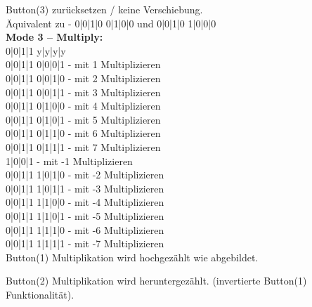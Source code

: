 \noindent Button(3) zurücksetzen / keine Verschiebung.\\
Äquivalent zu - {\color{red} 0}{\color{blue}|0|1|0} {\color{orange} 0|1|0|0} und 
{\color{red} 0}{\color{blue}|0|1|0} {\color{orange} 1|0|0|0}\\

\textbf{Mode 3 – Multiply:}\\
{\color{red} 0}{\color{blue}|0|1|1} {\color{orange}y|y|y|y}\\
{\color{red} 0}{\color{blue}|0|1|1} {\color{orange}0|0|0|1} - mit 1 Multiplizieren \\
{\color{red} 0}{\color{blue}|0|1|1} {\color{orange}0|0|1|0} - mit 2 Multiplizieren \\
{\color{red} 0}{\color{blue}|0|1|1} {\color{orange}0|0|1|1} - mit 3 Multiplizieren \\
{\color{red} 0}{\color{blue}|0|1|1} {\color{orange}0|1|0|0} - mit 4 Multiplizieren \\
{\color{red} 0}{\color{blue}|0|1|1} {\color{orange}0|1|0|1} - mit 5 Multiplizieren \\
{\color{red} 0}{\color{blue}|0|1|1} {\color{orange}0|1|1|0} - mit 6 Multiplizieren \\
{\color{red} 0}{\color{blue}|0|1|1} {\color{orange}0|1|1|1} - mit 7 Multiplizieren \\

 {\color{orange}1|0|0|1} - mit -1 Multiplizieren \\
{\color{red} 0}{\color{blue}|0|1|1} {\color{orange}1|0|1|0} - mit -2 Multiplizieren \\
{\color{red} 0}{\color{blue}|0|1|1} {\color{orange}1|0|1|1} - mit -3 Multiplizieren \\
{\color{red} 0}{\color{blue}|0|1|1} {\color{orange}1|1|0|0} - mit -4 Multiplizieren \\
{\color{red} 0}{\color{blue}|0|1|1} {\color{orange}1|1|0|1} - mit -5 Multiplizieren \\
{\color{red} 0}{\color{blue}|0|1|1} {\color{orange}1|1|1|0} - mit -6 Multiplizieren \\
{\color{red} 0}{\color{blue}|0|1|1} {\color{orange}1|1|1|1} - mit -7 Multiplizieren \\

\noindent Button(1) Multiplikation wird hochgezählt wie abgebildet.

\noindent Button(2) Multiplikation wird heruntergezählt.
(invertierte Button(1) Funktionalität).

